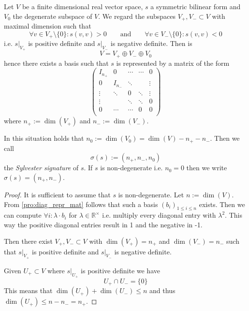 \begin{proposition}\label{pro:sylv_law_inertia}
   Let \(V\) be a finite dimensional real vector space, \(s\) a symmetric bilinear form and \(V_0\) the degenerate subspace of \(V\).
   We regard the subspaces \(V_+, V_- \subset V\) with maximal dimension such that
   \[\forall v \in V_+ \setminus \{0\}: s(v, v) > 0 \qquad\text{and}\qquad \forall v \in V_- \setminus \{0\}: s(v, v) < 0\]
   i.e. \(s\rvert_{V_+}\) is positive definite and \(s\rvert_{V_-}\) is negative definite.
   Then is
   \[V = V_+ \oplus V_- \oplus V_0\]
   hence there exists a basis such that \(s\) is represented by a matrix of the form
   \[\begin{pmatrix}
         I_{n_+} & 0       & \cdots & \cdots & 0\\
         0       & I_{n_-} & \ddots &        & \vdots \\
         \vdots  & \ddots  & 0      & \ddots & \vdots \\
         \vdots  &         & \ddots & \ddots & 0 \\
         0       & \cdots  & \cdots & 0      & 0\\
      \end{pmatrix}\]
      where \(n_+ := \dim(V_+)\) and \(n_- := \dim(V_-)\).
\end{proposition}
\begin{remark}
   In this situation holds that \(n_0 := \dim(V_0) = \dim(V) - n_+ - n_-\).
   Then we call
   \[\sigma(s) := (n_+, n_-, n_0)\]
   the \emph{Sylvester signature} of \(s\).
   If \(s\) is non-degenerate i.e. \(n_0 = 0\) then we write \(\sigma(s) = (n_+, n_-)\).
\end{remark}
\begin{proof}
   It is sufficient to assume that \(s\) is non-degenerate.
   Let \(n := \dim(V)\).
   From \cref{pro:diag_repr_mat} follows that such a basis \((b_i)_{1 \leq i \leq n}\) exists.
   Then we can compute \(\forall i: \lambda \cdot b_i\) for \(\lambda \in \mathbb{R}^\times\) i.e. multiply every diagonal entry with \(\lambda^2\).
   This way the positive diagonal entries result in 1 and the negative in -1.

   Then there exist \(V_+, V_- \subset V\) with \(\dim(V_+) = n_+\) and \(\dim(V_-) = n_-\) such that \(s\rvert_{V_+}\) is positive definite and \(s\rvert_{V_-}\) is negative definite.

   Given \(U_+ \subset V\) where \(s\rvert_{U_+}\) is positive definite we have
   \[U_+ \cap U_- = \{0\}\]
   This means that \(\dim(U_+) + \dim(U_-) \leq n\) and thus \(\dim(U_+) \leq n - n_- = n_+\).
\end{proof}

